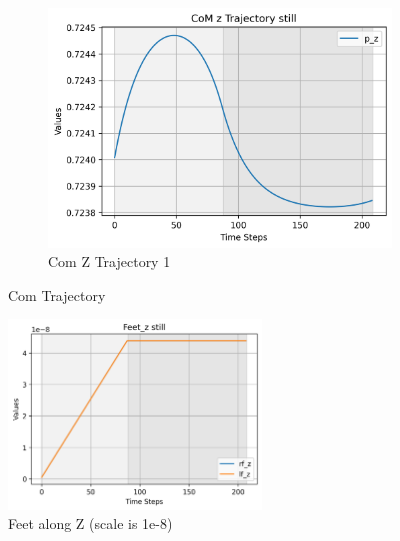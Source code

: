\documentclass[main.tex]{subfiles}
\begin{document}
\begin{figure}[H]
\begin{subfigure}[b]{0.45\textwidth}
        \includegraphics[width=\textwidth]{figures/CoM z Trajectory still.png}
        \caption{Com Z Trajectory 1}
        \label{fig:sub3_still}
    \end{subfigure}
    \caption{Com Trajectory}
    \label{fig:threeimages_still}
\end{figure}

\begin{figure}[htbp]
    \centering
    \includegraphics[width=0.6\textwidth]{figures/Feet_z still.png}
    \caption{Feet along Z (scale is 1e-8)}
    \label{fig:feet_still}
\end{figure}
\end{document}
